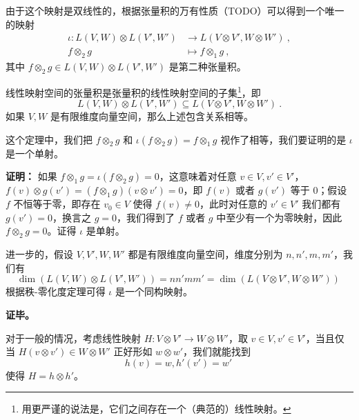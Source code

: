 
由于这个映射是双线性的，根据张量积的万有性质（TODO）可以得到一个唯一的映射
\begin{equation}
\begin{aligned}
\iota: L(V, W) \otimes L(V', W') &\to L(V \otimes V', W \otimes W')~, \\
f \otimes_2 g &\mapsto f \otimes_1 g~,
\end{aligned}
\end{equation}
其中 $f \otimes_2 g \in L(V, W) \otimes L(V', W')$ 是第二种张量积。

\begin{theorem}{}
线性映射空间的张量积是张量积的线性映射空间的子集\footnote{用更严谨的说法是，它们之间存在一个（典范的）线性映射。}，即
\begin{equation}
L(V, W) \otimes L(V', W') \subseteq L(V \otimes V', W \otimes W')~.
\end{equation}
如果 $V, W$ 是有限维度向量空间，那么上述包含关系相等。
\end{theorem}

这个定理中，我们把 $f \otimes_2 g$ 和 $\iota(f \otimes_2 g) = f \otimes_1 g$ 视作了相等，我们要证明的是 $\iota$ 是一个单射。

\textbf{证明：}
如果 $f \otimes_1 g = \iota(f \otimes_2 g) = 0$，这意味着对任意 $v \in V, v' \in V'$，$f(v) \otimes g(v') = (f \otimes_1 g)(v \otimes v') = 0$，即 $f(v)$ 或者 $g(v')$ 等于 $0$；假设 $f$ 不恒等于零，即存在 $v_0 \in V$ 使得 $f(v) \neq 0$，此时对任意的 $v' \in V'$ 我们都有 $g(v') = 0$，换言之 $g = 0$，我们得到了 $f$ 或者 $g$ 中至少有一个为零映射，因此 $f \otimes_2 g = 0$。证得 $\iota$ 是单射。

进一步的，假设 $V, V', W, W'$ 都是有限维度向量空间，维度分别为 $n, n', m, m'$，我们有
\begin{equation}
\dim(L(V, W) \otimes L(V', W')) = n n' m m' = \dim(L(V \otimes V', W \otimes W'))~
\end{equation}
根据秩-零化度定理可得 $\iota$ 是一个同构映射。

\textbf{证毕。}

对于一般的情况，考虑线性映射 $H: V \otimes V' \to W \otimes W'$，取 $v \in V, v' \in V'$，当且仅当 $H(v \otimes v') \in W \otimes W'$ 正好形如 $w \otimes w'$，我们就能找到
\begin{equation}
h(v) = w, h'(v') = w'~
\end{equation}
使得 $H = h \otimes h'$。

% 

